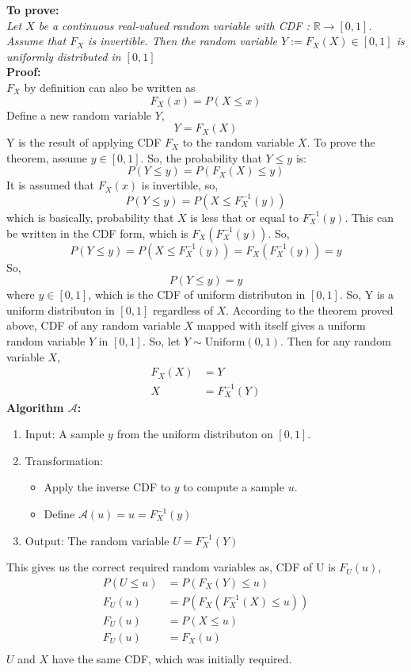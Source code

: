 \begin{solution}
		\textbf{To prove: }\\
		\emph{Let $X$ be a continuous real-valued random variable with CDF  : $\mathbb{R} \rightarrow [0, 1]$. Assume that
		$F_X$ is invertible. Then the random variable $Y := F_X (X) \in [0, 1]$ is uniformly distributed in $[0, 1]$}\\
		\textbf{Proof:}\\
		$F_X$ by definition can also be written as
		\[F_X(x) = P(X\leq x)\]
		Define a new random variable $Y$,
		\[Y =F_X(X) \]
		Y is the result of applying CDF $F_X$ to the random variable $X$.
		To prove the theorem, assume $y\in [0,1]$. So, the probability that $Y \leq y$ is:
		\[P(Y\leq y) = P(F_X(X)\leq y)\]
		It is assumed that $F_X(x)$ is invertible, so,
		\[P(Y\leq y) = P(X\leq F_X^{-1}(y))\]
		which is basically, probability that $X$ is less that or equal to $F_X^{-1}(y)$. This can be written in the CDF form, which is $F_X(F_X^{-1}(y))$. So,
		\[P(Y\leq y) = P(X\leq F_X^{-1}(y)) = F_X(F_X^{-1}(y)) = y\]
		So,
		\[P(Y\leq y) = y\]
		where $y\in [0,1]$, which is the CDF of uniform distributon in $[0,1]$.
	So, Y is a uniform distributon in $[0,1]$ regardless of $X$.
		According to the theorem proved above, CDF of any random variable $X$ mapped with itself gives a uniform
		random variable $Y$ in $[0,1]$. So, let $Y\sim \text{Uniform}(0,1)$. Then for any random variable $X$,
		\begin{align}
			F_X(X) & = Y \\
			X & = F_X^{-1}(Y)
		\end{align}
		\textbf{Algorithm $\mathcal{A}$:}
		\begin{enumerate}
			\item Input: A sample $y$ from the uniform distributon on $[0,1]$.
			\item Transformation:
			\begin{itemize}
				\item Apply the inverse CDF to $y$ to compute a sample $u$.
				\item Define $\mathcal{A}(u) = u = F_X^{-1}(y)$
			\end{itemize}
			\item Output: The random variable $U = F_X^{-1}(Y)$
		\end{enumerate}
		This gives us the correct required random variables as, CDF of U is $F_U(u)$,
		\begin{align}
			P(U\leq u ) & = P(F_X(Y) \leq u)\\
			F_U(u) & =  P(F_X(F_X^{-1}(X) \leq u))\\
			F_U(u) & =  P(X \leq u) \\
			F_U(u) & =  F_X(u) \\ 
		\end{align}
		$U$ and $X$ have the same CDF, which was initially required.



\end{solution}
